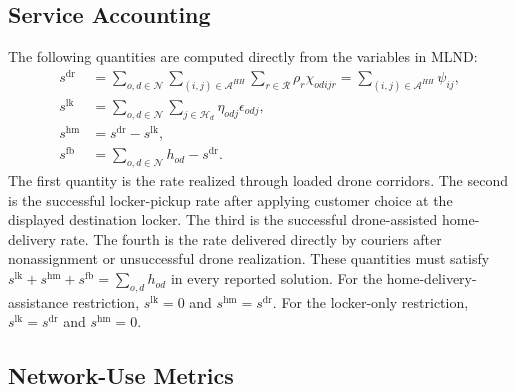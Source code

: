 \documentclass[final,3p,authoryear]{elsarticle}
\begin{document}
\subsection{Service Accounting}

The following quantities are computed directly from the variables in MLND:
\begin{subequations}
\label{eq:reported_service_components}
\begin{align}
s^{\mathrm{dr}}
&=
\sum_{o,d\in\mathcal N}
\sum_{(i,j)\in\mathcal A^{HH}}
\sum_{r\in\mathcal R}
\rho_r\chi_{odijr}
=
\sum_{(i,j)\in\mathcal A^{HH}}\psi_{ij},
\label{eq:reported_drone_service}
\\
s^{\mathrm{lk}}
&=
\sum_{o,d\in\mathcal N}
\sum_{j\in\mathcal H_d}
\eta_{odj}\epsilon_{odj},
\label{eq:reported_locker_service}
\\
s^{\mathrm{hm}}
&=
s^{\mathrm{dr}}-s^{\mathrm{lk}},
\label{eq:reported_assisted_home}
\\
s^{\mathrm{fb}}
&=
\sum_{o,d\in\mathcal N}h_{od}-s^{\mathrm{dr}}.
\label{eq:reported_fallback}
\end{align}
\end{subequations}
The first quantity is the rate realized through loaded drone corridors.
The second is the successful locker-pickup rate after applying customer choice at the displayed destination locker.
The third is the successful drone-assisted home-delivery rate.
The fourth is the rate delivered directly by couriers after nonassignment or unsuccessful drone realization.
These quantities must satisfy $s^{\mathrm{lk}}+s^{\mathrm{hm}}+s^{\mathrm{fb}}=\sum_{o,d}h_{od}$ in every reported solution.
For the home-delivery-assistance restriction, $s^{\mathrm{lk}}=0$ and $s^{\mathrm{hm}}=s^{\mathrm{dr}}$.
For the locker-only restriction, $s^{\mathrm{lk}}=s^{\mathrm{dr}}$ and $s^{\mathrm{hm}}=0$.

\subsection{Network-Use Metrics}
\end{document}
